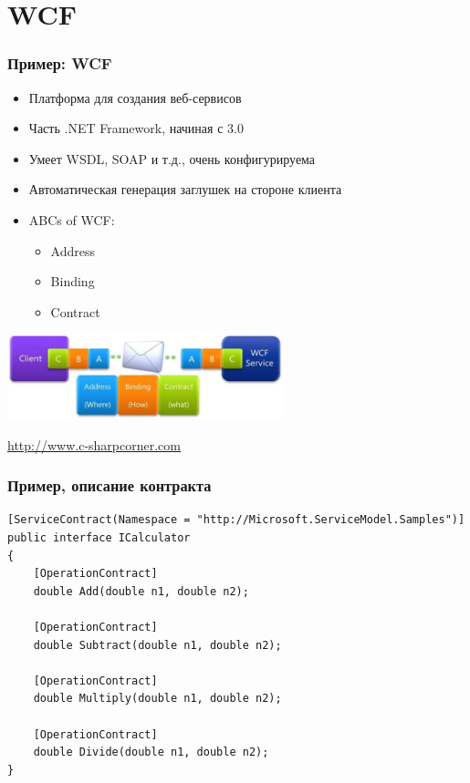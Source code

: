 \documentclass[xetex,mathserif,serif]{beamer}
\newcommand{\attribution}[1] {
	\begin{flushright}\begin{scriptsize}\textcolor{gray}{\textcopyright\; #1}\end{scriptsize}\end{flushright}
}
\begin{document}
	\section{WCF}

	\begin{frame}
		\frametitle{Пример: WCF}
		\begin{itemize}
			\item Платформа для создания веб-сервисов
			\item Часть .NET Framework, начиная с 3.0
			\item Умеет WSDL, SOAP и т.д., очень конфигурируема
			\item Автоматическая генерация заглушек на стороне клиента
			\item ABCs of WCF:
			\begin{itemize}
				\item Address
				\item Binding
				\item Contract
			\end{itemize}
		\end{itemize}
		\begin{center}
			\includegraphics[width=0.6\textwidth]{wcf.png}
			\attribution{\url{http://www.c-sharpcorner.com}}
		\end{center}
	\end{frame}

	\begin{frame}[fragile]
		\frametitle{Пример, описание контракта}
		\begin{small}
			\begin{verbatim}
[ServiceContract(Namespace = "http://Microsoft.ServiceModel.Samples")]  
public interface ICalculator  
{
    [OperationContract]
    double Add(double n1, double n2);

    [OperationContract]
    double Subtract(double n1, double n2);

    [OperationContract]
    double Multiply(double n1, double n2);

    [OperationContract]
    double Divide(double n1, double n2);
}
			\end{verbatim}
		\end{small}
	\end{frame}
\end{document}
